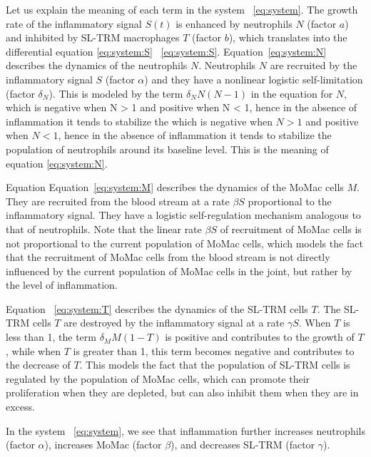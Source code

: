 \documentclass[a4paper, 12pt]{article}
\providecommand{\DIFaddtex}[1]{{\protect\color{blue} \sf #1}} %
\providecommand{\DIFdeltex}[1]{{\protect\color{red} \scriptsize #1}} %
\providecommand{\DIFaddbegin}{} %
\providecommand{\DIFaddend}{} %
\providecommand{\DIFdelbegin}{} %
\providecommand{\DIFdelend}{} %
\providecommand{\DIFadd}[1]{\texorpdfstring{\DIFaddtex{#1}}{#1}} %
\providecommand{\DIFdel}[1]{\texorpdfstring{\DIFdeltex{#1}}{}} %
\begin{document}
Let us explain the meaning of each term in the system\DIFaddbegin \DIFadd{~}\DIFaddend \eqref{eq:system}.
The growth rate of the inflammatory signal $S(t)$ is enhanced by neutrophils $N$ (factor $a$) and inhibited by SL-TRM macrophages $T$ (factor $b$), which translates into the differential equation\DIFdelbegin \DIFdel{\eqref{eq:system:S}}\DIFdelend \DIFaddbegin \DIFadd{~\eqref{eq:system:S}.
Equation~\eqref{eq:system:N} describes the dynamics of the neutrophils $N$}\DIFaddend .
 Neutrophils $N$ are recruited by the inflammatory signal $S$ (factor $\alpha$) and they have a nonlinear logistic self-limitation (factor $\delta_N$). This is modeled by the term $\delta_N N (N-1)$ in the equation for $N$,
which is negative when N > 1 and positive when N < 1, hence in the absence of inflammation it tends to stabilize the
\DIFdelbegin \DIFdel{which is negative when $N>1$ and positive when $N<1$, hence in the absence of inflammation it tends to stabilize the
}\DIFdelend population of neutrophils around its baseline level. 
\DIFdelbegin \DIFdel{This is the meaning of equation \eqref{eq:system:N}.
 }%

\DIFdel{Equation}\DIFdelend \DIFaddbegin \DIFadd{Equation~}\DIFaddend \eqref{eq:system:M} describes the dynamics of the MoMac cells $M$. They are recruited from the blood stream at a  rate $\beta S$ proportional to the inflammatory signal. They have a logistic self-regulation mechanism analogous to that of neutrophils.
 Note that the linear rate $\beta S$ of recruitment of MoMac cells is not proportional to the current population of MoMac cells, which models the fact that the recruitment of MoMac cells from the blood stream is not directly influenced by the current population of MoMac cells in the joint, but rather by the level of inflammation.

Equation\DIFaddbegin \DIFadd{~}\DIFaddend \eqref{eq:system:T} describes the dynamics of the SL-TRM cells $T$. The SL-TRM cells $T$ are destroyed by the inflammatory signal at a rate $\gamma S$. When $T$ is less than 1, the term $\delta_M M (1-T)$ is positive and contributes to the growth of $T$, while when $T$ is greater than 1, this term becomes negative and contributes to the decrease of $T$. This models the fact that the population of SL-TRM cells is regulated by the population of MoMac cells, which can promote their proliferation when they are depleted, but can also inhibit them when they are in excess. 


In the system\DIFaddbegin \DIFadd{~}\DIFaddend \eqref{eq:system}, we see that inflammation further increases neutrophils (factor $\alpha$), increases MoMac (factor $\beta$), and decreases SL-TRM (factor $\gamma$).
\DIFdelbegin %
\end{document}
